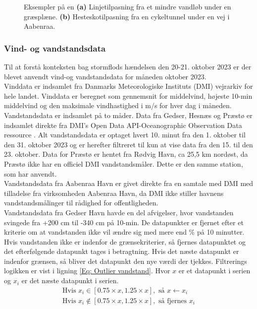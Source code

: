 \begin{figure}[H]
\begin{subfigure}[b]{0.5\textwidth}
        \caption{}
        \label{Subfig: Hesteskotilpasning}
    \end{subfigure}
    \caption{Eksempler på en \textbf{(a)} Linjetilpasning fra et mindre vandløb under en græsplæne. \textbf{(b)} Hesteskotilpasning fra en cykeltunnel under en vej i Aabenraa. }
    \label{Figur: Linje- og hesteskotilpasninger}
\end{figure}


\subsubsection{Vind- og vandstandsdata} \label{Vind- og vandstandsdata}
Til at forstå konteksten bag stormflods hændelsen den 20-21. oktober 2023 er der blevet anvendt vind-og vandstandsdata for måneden oktober 2023. \\
Vinddata er indsamlet fra Danmarks Meteorologiske Instituts (DMI) vejrarkiv \citep{dmi_vejrarkiv} for hele landet. 
Vinddata er beregnet som gennemsnit for middelvind, højeste 10-min middelvind og den maksimale vindhastighed i m/s for hver dag i måneden. \\

Vandstandsdata er indsamlet på to måder. Data fra Gedser, Hesnæs og Præstø er indsamlet direkte fra DMI's Open Data API-Oceanographic Observation Data ressource \citep{dmi_open_data}. Alt vandstandsdata er optaget hvert 10. minut fra den 1. oktober til den 31. oktober 2023 og er herefter filtreret til kun at vise data fra den 15. til den 23. oktober. Data for Præstø er hentet fra Rødvig Havn, ca 25,5 km nordøst, da Præstø ikke har en officiel DMI vandstandsmåler. Dette er den samme station, som \cite{cowi_praesto_2025} har anvendt. \\
Vandstandsdata fra Aabenraa Havn er givet direkte fra en samtale med DMI med tilladelse fra virksomheden Aabenraa Havn, da DMI ikke stiller havnens vandstandsmålinger til rådighed for offentligheden. \\

Vandstandsdata fra Gedser Havn havde en del afvigelser, hvor vandstanden svingede fra +200 cm til -340 cm på 10-min. De datapunkter er fjernet efter et kriterie om at vandstanden ikke vil ændre sig med mere end \% på 10 minutter. Hvis vandstanden ikke er indenfor de grænsekriterier, så fjernes datapunktet og det efterfølgende datapunkt tages i betragtning. Hvis det næste datapunkt er indenfor grænsen, så bliver det datapunkt den nye værdi der tjekkes. Filtrerings logikken er vist i ligning \ref{Eq: Outlier vandstand}. Hvor $x$ er et datapunkt i serien og $x_i$ er det næste datapunkt i serien.
\begin{align} \label{Eq: Outlier vandstand}
    \text{Hvis } x_i \in [0.75\times x, 1.25\times x], \text{ så } x \leftarrow x_i \nonumber \\
    \text{Hvis } x_i \notin [0.75\times x, 1.25\times x], \text{ så fjernes } x_i
\end{align}

